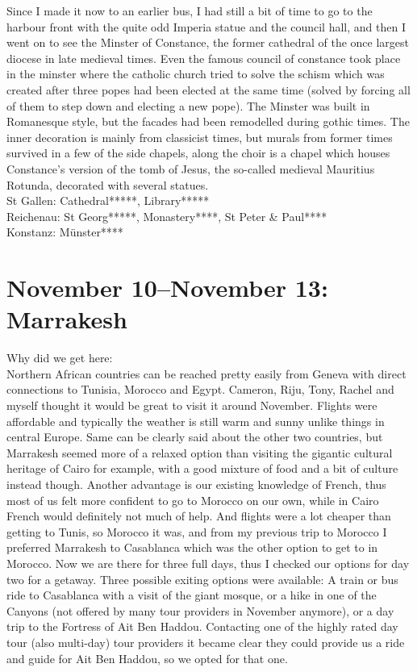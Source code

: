  Since I made it now to an earlier bus, I had still a bit of time to go to the harbour front with the quite odd Imperia statue and the council hall, and then I went on to see the Minster of Constance, the former cathedral of the once largest diocese in late medieval times. Even the famous council of constance took place in the minster where the catholic church tried to solve the schism which was created after three popes had been elected at the same time (solved by forcing all of them to step down and electing a new pope). The Minster was built in Romanesque style, but the facades had been remodelled during gothic times. The inner decoration is mainly from classicist times, but murals from former times survived in a few of the side chapels, along the choir is a chapel which houses Constance's version of the tomb of Jesus, the so-called medieval Mauritius Rotunda, decorated with several statues.\\

St Gallen: Cathedral*****, Library*****\\
Reichenau: St Georg*****, Monastery****, St Peter \& Paul****\\
Konstanz: M\"unster****

\section{November 10--November 13: Marrakesh}
\label{Marrakesh2017}

Why did we get here:\\
Northern African countries can be reached pretty easily from Geneva with direct connections to Tunisia, Morocco and Egypt. Cameron, Riju, Tony, Rachel and myself thought it would be great to visit it around November. Flights were affordable and typically the weather is still warm and sunny unlike things in central Europe. Same can be clearly said about the other two countries, but Marrakesh seemed more of a relaxed option than visiting the gigantic cultural heritage of Cairo for example, with a good mixture of food and a bit of culture instead though. Another advantage is our existing knowledge of French, thus most of us felt more confident to go to Morocco on our own, while in Cairo French would definitely not much of help. And flights were a lot cheaper than getting to Tunis, so Morocco it was, and from my previous trip to Morocco I preferred Marrakesh to Casablanca which was the other option to get to in Morocco. Now we are there for three full days, thus I checked our options for day two for a getaway. Three possible exiting options were available: A train or bus ride to Casablanca with a visit of the giant mosque, or a hike in one of the Canyons (not offered by many tour providers in November anymore), or a day trip to the Fortress of Ait Ben Haddou. Contacting one of the highly rated day tour (also multi-day) tour providers it became clear they could provide us a ride and guide for Ait Ben Haddou, so we opted for that one.\\

